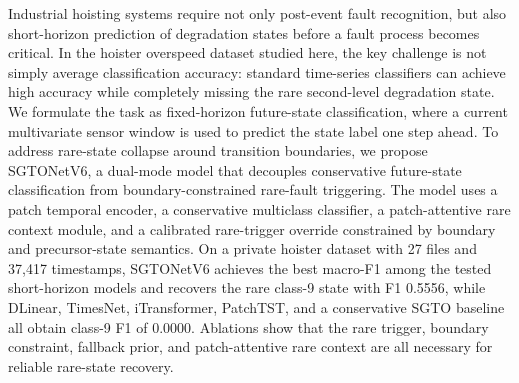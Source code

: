 Industrial hoisting systems require not only post-event fault recognition, but also short-horizon prediction of degradation states before a fault process becomes critical. In the hoister overspeed dataset studied here, the key challenge is not simply average classification accuracy: standard time-series classifiers can achieve high accuracy while completely missing the rare second-level degradation state. We formulate the task as fixed-horizon future-state classification, where a current multivariate sensor window is used to predict the state label one step ahead. To address rare-state collapse around transition boundaries, we propose SGTONetV6, a dual-mode model that decouples conservative future-state classification from boundary-constrained rare-fault triggering. The model uses a patch temporal encoder, a conservative multiclass classifier, a patch-attentive rare context module, and a calibrated rare-trigger override constrained by boundary and precursor-state semantics. On a private hoister dataset with 27 files and 37,417 timestamps, SGTONetV6 achieves the best macro-F1 among the tested short-horizon models and recovers the rare class-9 state with F1 0.5556, while DLinear, TimesNet, iTransformer, PatchTST, and a conservative SGTO baseline all obtain class-9 F1 of 0.0000. Ablations show that the rare trigger, boundary constraint, fallback prior, and patch-attentive rare context are all necessary for reliable rare-state recovery.
